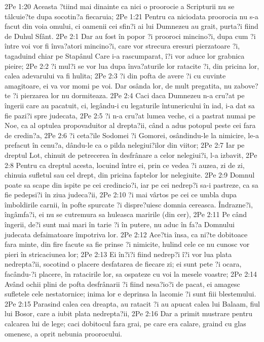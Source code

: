 2Pe 1:20  Aceasta ?tiind mai dinainte ca nici o proorocie a Scripturii nu se tâlcuie?te dupa socotin?a fiecaruia;
2Pe 1:21  Pentru ca niciodata proorocia nu s-a facut din voia omului, ci oamenii cei sfin?i ai lui Dumnezeu au grait, purta?i fiind de Duhul Sfânt.
2Pe 2:1  Dar au fost în popor ?i prooroci mincino?i, dupa cum ?i între voi vor fi înva?atori mincino?i, care vor strecura eresuri pierzatoare ?i, tagaduind chiar pe Stapânul Care i-a rascumparat, î?i vor aduce lor grabnica pieire;
2Pe 2:2  ?i mul?i se vor lua dupa înva?aturile lor ratacite ?i, din pricina lor, calea adevarului va fi hulita;
2Pe 2:3  ?i din pofta de avere ?i cu cuvinte amagitoare, ei va vor momi pe voi. Dar osânda lor, de mult pregatita, nu zabove?te ?i pierzarea lor nu dormiteaza.
2Pe 2:4  Caci daca Dumnezeu n-a cru?at pe îngerii care au pacatuit, ci, legându-i cu legaturile întunericului în iad, i-a dat sa fie pazi?i spre judecata,
2Pe 2:5  ?i n-a cru?at lumea veche, ci a pastrat numai pe Noe, ca al optulea propovaduitor al drepta?ii, când a adus potopul peste cei fara de credin?a,
2Pe 2:6  ?i ceta?ile Sodomei ?i Gomorei, osândindu-le la nimicire, le-a prefacut în cenu?a, dându-le ca o pilda nelegiui?ilor din viitor;
2Pe 2:7  Iar pe dreptul Lot, chinuit de petrecerea în desfrânare a celor nelegiui?i, l-a izbavit,
2Pe 2:8  Pentru ca dreptul acesta, locuind între ei, prin ce vedea ?i auzea, zi de zi, chinuia sufletul sau cel drept, din pricina faptelor lor nelegiuite.
2Pe 2:9  Domnul poate sa scape din ispite pe cei credincio?i, iar pe cei nedrep?i sa-i pastreze, ca sa fie pedepsi?i în ziua judeca?ii,
2Pe 2:10  ?i mai vârtos pe cei ce umbla dupa îmboldirile carnii, în pofte spurcate ?i dispre?uiesc domnia cereasca. Îndrazne?i, îngâmfa?i, ei nu se cutremura sa huleasca maririle (din cer),
2Pe 2:11  Pe când îngerii, de?i sunt mai mari în tarie ?i în putere, nu aduc în fa?a Domnului judecata defaimatoare împotriva lor.
2Pe 2:12  Ace?tia însa, ca ni?te dobitoace fara minte, din fire facute sa fie prinse ?i nimicite, hulind cele ce nu cunosc vor pieri în stricaciunea lor;
2Pe 2:13  Ei în?i?i fiind nedrep?i î?i vor lua plata nedrepta?ii, socotind o placere desfatarea de fiecare zi; ei sunt pete ?i ocara, facându-?i placere, în ratacirile lor, sa ospateze cu voi la mesele voastre;
2Pe 2:14  Având ochii plini de pofta desfrânarii ?i fiind nesa?io?i de pacat, ei amagesc sufletele cele nestatornice; inima lor e deprinsa la lacomie ?i sunt fiii blestemului.
2Pe 2:15  Parasind calea cea dreapta, au ratacit ?i au apucat calea lui Balaam, fiul lui Bosor, care a iubit plata nedrepta?ii,
2Pe 2:16  Dar a primit mustrare pentru calcarea lui de lege; caci dobitocul fara grai, pe care era calare, graind cu glas omenesc, a oprit nebunia proorocului.
